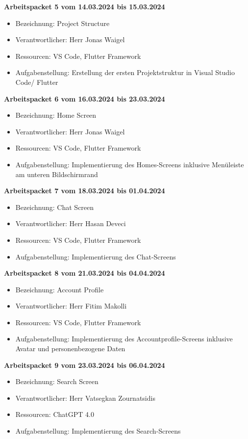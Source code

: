 \newpage
\textbf{Arbeitspacket 5 vom 14.03.2024 bis 15.03.2024}
\begin{itemize}[itemsep=0pt]
    \item{Bezeichnung: Project Structure} 
	\item{Verantwortlicher: Herr Jonas Waigel} 
	\item{Ressourcen: VS Code, Flutter Framework} 
    \item{Aufgabenstellung: Erstellung der ersten Projektstruktur in Visual Studio Code/ Flutter}
\end{itemize}

\textbf{Arbeitspacket 6 vom 16.03.2024 bis 23.03.2024}
\begin{itemize}[itemsep=0pt]
    \item{Bezeichnung: Home Screen} 
	\item{Verantwortlicher: Herr Jonas Waigel} 
	\item{Ressourcen: VS Code, Flutter Framework} 
    \item{Aufgabenstellung: Implementierung des Homes-Screens inklusive Menüleiste am unteren Bildschirmrand}
\end{itemize}

\textbf{Arbeitspacket 7 vom 18.03.2024 bis 01.04.2024}
\begin{itemize}[itemsep=0pt]
    \item{Bezeichnung: Chat Screen} 
	\item{Verantwortlicher: Herr Hasan Deveci} 
	\item{Ressourcen: VS Code, Flutter Framework} 
    \item{Aufgabenstellung: Implementierung des Chat-Screens}
\end{itemize} 

\textbf{Arbeitspacket 8 vom 21.03.2024 bis 04.04.2024}
\begin{itemize}[itemsep=0pt]
    \item{Bezeichnung: Account Profile} 
	\item{Verantwortlicher: Herr Fitim Makolli} 
	\item{Ressourcen: VS Code, Flutter Framework} 
    \item{Aufgabenstellung: Implementierung des Accountprofile-Screens inklusive Avatar und personenbezogene Daten}
\end{itemize}


\textbf{Arbeitspacket 9 vom 23.03.2024 bis 06.04.2024}
\begin{itemize}[itemsep=0pt]
    \item{Bezeichnung: Search Screen} 
	\item{Verantwortlicher: Herr Vatsegkan Zournatsidis} 
	\item{Ressourcen: ChatGPT 4.0} 
    \item{Aufgabenstellung: Implementierung des Search-Screens}
\end{itemize}

